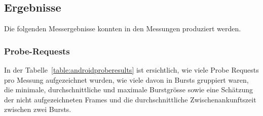 \subsection{Ergebnisse}
Die folgenden Messergebnisse konnten in den Messungen produziert werden.

\subsubsection*{Probe-Requests}
In der Tabelle~\ref{table:androidproberesults} ist ersichtlich, wie viele Probe 
Requests pro Messung aufgezeichnet wurden, wie viele davon in Bursts gruppiert
waren, die minimale, durchschnittliche und maximale Burstgrösse sowie eine 
Schätzung der nicht aufgezeichneten Frames und die durchschnittliche 
Zwischenankunftszeit zwischen zwei Bursts.

